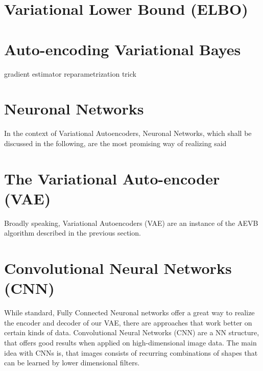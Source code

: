 \section{Variational Lower Bound (ELBO)}





\section{Auto-encoding Variational Bayes}
gradient estimator
reparametrization trick


\section{Neuronal Networks}
In the context of Variational Autoencoders, Neuronal Networks, which shall be discussed in the following, are the most promising way of realizing said


\section{The Variational Auto-encoder (VAE)}
Broadly speaking, Variational Autoencoders (VAE) are an instance of the AEVB algorithm described in the previous section. 


\section{Convolutional Neural Networks (CNN)}
While standard, Fully Connected Neuronal networks offer a great way to realize the encoder and decoder of our VAE, there are approaches that work better on certain kinds of data. Convolutional Neural Networks (CNN) are a NN structure, that offers good results when applied on high-dimensional image data. The main idea with CNNs is, that images consists of recurring combinations of shapes that can be learned by lower dimensional filters. %